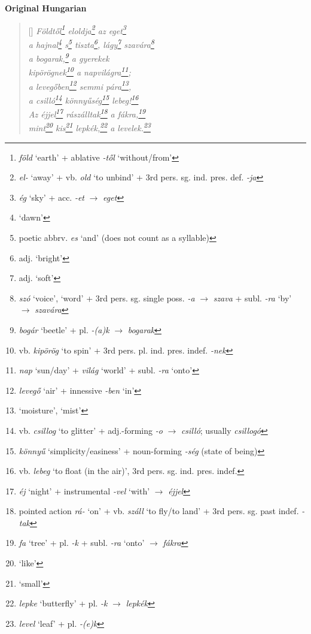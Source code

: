 \documentclass[a4paper,12pt,twoside,final]{book}
\begin{document}
\newpage


\noindent \textbf{Original Hungarian}



\settowidth{\versewidth}{a hajnal s tiszta, lágy szavára}

\begin{verse}[\versewidth]
  \it
  Földtől\footnote{\emph{föld} `earth' +
  ablative \emph{-től} `without/from'} eloldja\footnote{\emph{el-} `away'
  + vb. \emph{old} `to unbind' + 3rd
  pers. sg. ind. pres. def. \emph{-ja}} az eget\footnote{\emph{ég}
  `sky' + acc. \emph{-et} $\rightarrow$ \emph{eget}} \\
  a hajnal\footnote{`dawn'} s\footnote{poetic abbrv. \emph{es} `and'
  (does not count as a syllable)} tiszta\footnote{adj. `bright'},
  lágy\footnote{adj. `soft'} szavára\footnote{\emph{szó} `voice',
  `word' + 3rd pers. sg. single poss. \emph{-a} $\rightarrow$
  \emph{szava} + subl. \emph{-ra} `by' $\rightarrow$
  \emph{szavára}} \\

  a bogarak,\footnote{\emph{bogár} `beetle' + pl. \emph{-(a)k}
  $\rightarrow$ \emph{bogarak}} a gyerekek \\
  kipörögnek\footnote{vb. \emph{kipörög} `to spin' + 3rd
  pers. pl. ind. pres. indef. \emph{-nek}}
  a napvilágra\footnote{\emph{nap} `sun/day' + \emph{világ}
  `world' + subl. \emph{-ra} `onto'}; \\
  a levegőben\footnote{\emph{levegő} `air' +
  innessive \emph{-ben} `in'} semmi pára\footnote{`moisture', `mist'}, \\
  a csilló\footnote{vb. \emph{csillog} `to glitter' +
  adj.-forming \emph{-o} $\rightarrow$
  \emph{csilló}; usually \emph{csillogó}}
  könnyűség\footnote{\emph{könnyű} `simplicity/easiness' + noun-forming
  \emph{-ség} (state of being)}
  lebeg!\footnote{vb. \emph{lebeg} `to float (in the air)', 3rd
  pers. sg. ind. pres. indef.} \\
  Az éjjel\footnote{\emph{éj} `night' + instrumental \emph{-vel}
  `with' $\rightarrow$ \emph{éjjel}} rászálltak\footnote{pointed
  action \emph{rá-} `on' + vb. \emph{száll} `to fly/to
  land' + 3rd pers. sg. past indef. \emph{-tak}} a
  fákra,\footnote{\emph{fa} `tree' +
  pl. \emph{-k} + subl. \emph{-ra} `onto' $\rightarrow$ \emph{fákra}} \\
  mint\footnote{`like'} kis\footnote{`small'} lepkék,\footnote{\emph{lepke}
  `butterfly' + pl. \emph{-k} $\rightarrow$ \emph{lepkék}} a
  levelek.\footnote{\emph{level} `leaf' + pl. \emph{-(e)k}} \\
\end{verse}
\end{document}
